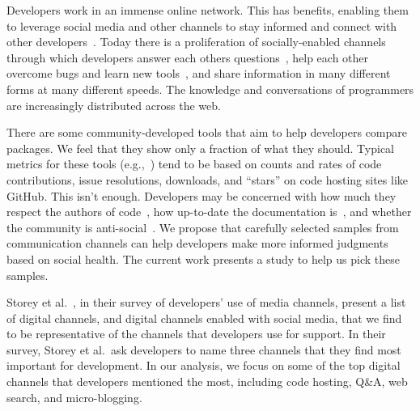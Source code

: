 Developers work in an immense online network.
This has benefits, enabling them to leverage social media and other channels to stay informed and connect with other developers~\cite{singer_software_2014,storey_how_2016}.
Today there is a proliferation of socially-enabled channels~\cite{storey_revolution_2014} through which developers answer each others questions~\cite{mamykina_fastest_2011}, help each other overcome bugs and learn new tools~\cite{parnin_blogging_2013}, and share information in many different forms at many different speeds.
The knowledge and conversations of programmers are increasingly distributed across the web.

There are some community-developed tools that aim to help developers compare packages.
We feel that they show only a fraction of what they should.
Typical metrics for these tools (e.g.,~\cite{awesome_python,ruby_toolbox,package_quality}) tend to be based on counts and rates of code contributions, issue resolutions, downloads, and ``stars'' on code hosting sites like GitHub.
This isn't enough.
Developers may be concerned with how much they respect the authors of code~\cite{robillard_field_2011}, how up-to-date the documentation is~\cite{storey_revolution_2014,nykaza_what_2002,lethbridge_how_2003,robillard_field_2011}, and whether the community is anti-social~\cite{storey_revolution_2014}.
We propose that carefully selected samples from communication channels can help developers make more informed judgments based on social health.
The current work presents a study to help us pick these samples.


Storey et al.~\cite{storey_revolution_2014}, in their survey of developers' use of media channels, present a list of digital channels, and digital channels enabled with social media, that we find to be representative of the channels that developers use for support.
In their survey, Storey et al.\ ask developers to name three channels that they find most important for development.
In our analysis, we focus on some of the top digital channels that developers mentioned the most, including code hosting, Q\&A, web search, and micro-blogging.

